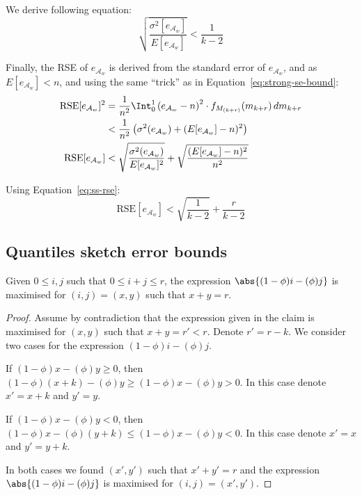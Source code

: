 We derive following equation:
\begin{equation}
    \sqrt{\frac{\sigma^2[e_{{\mathcal{A}}_w}]}{E[e_{{\mathcal{A}}_w}]}}<\frac{1}{k-2}
    \label{eq:ss-rse}
\end{equation}

Finally, the RSE of $e_{{\mathcal{A}}_w}$ is derived from the standard error of $e_{{\mathcal{A}}_w}$, and as $E[e_{{\mathcal{A}}_w}] < n$,
and using the same ``trick'' as in Equation~\ref{eq:strong-se-bound}:
\begin{align*}
    \text{RSE}[e_{{\mathcal{A}}_w}]^2 &= \frac{1}{n^2}\Int_{0}^{1} \left( e_{{\mathcal{A}}_w} - n \right)^2 \cdot f_{M_{(k+r)}}(m_{k+r}) \,dm_{k+r} \\
    &< \frac{1}{n^2} \left(\sigma^2(e_{{\mathcal{A}}_w}) + (E[e_{{\mathcal{A}}_w}] - n)^2 \right)\\
    \text{RSE}[e_{{\mathcal{A}}_w}] &< \sqrt{\frac{\sigma^2(e_{{\mathcal{A}}_w})}{E[e_{{\mathcal{A}}_w}]^2}} + \sqrt{\frac{(E[e_{{\mathcal{A}}_w}] - n)^2}{n^2}}
\end{align*}

Using Equation~\ref{eq:ss-rse}:
\begin{equation}
    \text{RSE}[e_{{\mathcal{A}}_w}] < \sqrt{\frac{1}{k-2}} + \frac{r}{k-2}
    \label{eq:theta-rse-weak-bound}
\end{equation}

\subsection{Quantiles sketch error bounds}
\label{ssec:quantiles-sketch-error-bounds}

\iffalse

\begin{claim}
    Given $0\leq i,j$ such that $0\leq i+j\leq r$, the expression $\abs{(1-\phi)i - (\phi)j}$
    is maximised for $(i,j)=(x,y)$ such that $x+y=r$.
    \label{claim:sum-r}
\end{claim}
\begin{proof}
    Assume by contradiction that the expression given in the claim is maximised for $(x,y)$ such that $x+y=r'<r$. Denote
    $r'=r-k$. We consider two cases for the expression $(1-\phi)i - (\phi)j$.

    If $(1-\phi)x - (\phi)y \geq 0$, then $(1-\phi)(x+k) - (\phi)y \geq (1-\phi)x - (\phi)y >0$. In this
    case denote $x'=x+k$ and $y'=y$.

    If $(1-\phi)x - (\phi)y < 0$, then $(1-\phi)x - (\phi)(y+k) \leq (1-\phi)x - (\phi)y < 0$. In this
    case denote $x'=x$ and $y'=y+k$.

    In both cases we found $(x',y')$ such that $x'+y'=r$ and the expression $\abs{(1-\phi)i - (\phi)j}$
    is maximised for $(i,j)=(x',y')$.
\end{proof}

